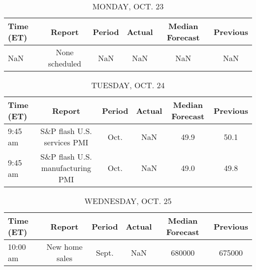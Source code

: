 \documentclass{article}%
\begin{document}
%
\normalsize%


\begin{table}[htbp]%
\caption{MONDAY, OCT. 23}%
\centering%
\begin{adjustbox}{width=1\textwidth}%
\begin{tabular}{lccccc}
\toprule
Time (ET) &         Report & Period & Actual & Median Forecast & Previous \\
\midrule
      NaN & None scheduled &    NaN &    NaN &             NaN &      NaN \\
\bottomrule
\end{tabular}
%
\end{adjustbox}%
\end{table}

%


\begin{table}[htbp]%
\caption{TUESDAY, OCT. 24}%
\centering%
\begin{adjustbox}{width=1\textwidth}%
\begin{tabular}{lccccc}
\toprule
Time (ET) &                           Report & Period & Actual & Median Forecast & Previous \\
\midrule
  9:45 am &      S\&P flash U.S. services PMI &   Oct. &    NaN &            49.9 &     50.1 \\
  9:45 am & S\&P flash U.S. manufacturing PMI &   Oct. &    NaN &            49.0 &     49.8 \\
\bottomrule
\end{tabular}
%
\end{adjustbox}%
\end{table}

%


\begin{table}[htbp]%
\caption{WEDNESDAY, OCT. 25}%
\centering%
\begin{adjustbox}{width=1\textwidth}%
\begin{tabular}{lccccc}
\toprule
Time (ET) &         Report & Period & Actual & Median Forecast & Previous \\
\midrule
 10:00 am & New home sales &  Sept. &    NaN &          680000 &   675000 \\
\bottomrule
\end{tabular}
%
\end{adjustbox}%
\end{table}

%
\end{document}
